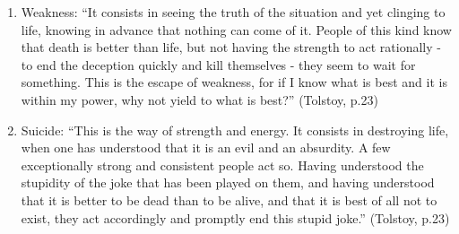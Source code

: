 \documentclass[]{article}
\begin{document}
\begin{enumerate}
\def\labelenumi{\arabic{enumi}.}
\setcounter{enumi}{3}
\itemsep1pt\parskip0pt
\item
  Weakness: ``It consists in seeing the truth of the situation and yet
  clinging to life, knowing in advance that nothing can come of it.
  People of this kind know that death is better than life, but not
  having the strength to act rationally - to end the deception quickly
  and kill themselves - they seem to wait for something. This is the
  escape of weakness, for if I know what is best and it is within my
  power, why not yield to what is best?'' (Tolstoy, p.23)
\item
  Suicide: ``This is the way of strength and energy. It consists in
  destroying life, when one has understood that it is an evil and an
  absurdity. A few exceptionally strong and consistent people act so.
  Having understood the stupidity of the joke that has been played on
  them, and having understood that it is better to be dead than to be
  alive, and that it is best of all not to exist, they act accordingly
  and promptly end this stupid joke.'' (Tolstoy, p.23)
\end{enumerate}
\end{document}
